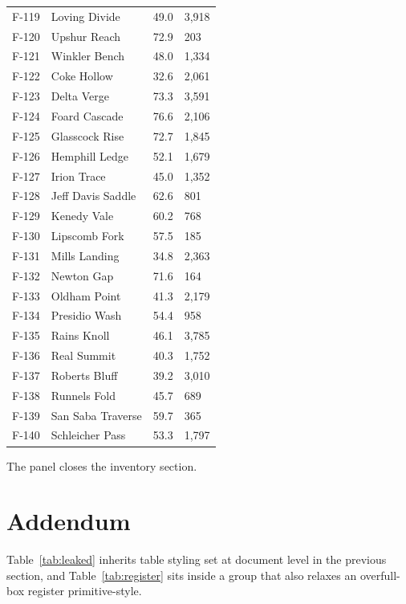 \documentclass[11pt]{article}
\begin{document}
\begin{longtable}{C{1.4cm} L{4.6cm} C{2.0cm} C{2.4cm}}
F-119 & Loving Divide & 49.0 & 3{,}918 \\
F-120 & Upshur Reach & 72.9 & 203 \\
F-121 & Winkler Bench & 48.0 & 1{,}334 \\
F-122 & Coke Hollow & 32.6 & 2{,}061 \\
F-123 & Delta Verge & 73.3 & 3{,}591 \\
F-124 & Foard Cascade & 76.6 & 2{,}106 \\
F-125 & Glasscock Rise & 72.7 & 1{,}845 \\
F-126 & Hemphill Ledge & 52.1 & 1{,}679 \\
F-127 & Irion Trace & 45.0 & 1{,}352 \\
F-128 & Jeff Davis Saddle & 62.6 & 801 \\
F-129 & Kenedy Vale & 60.2 & 768 \\
F-130 & Lipscomb Fork & 57.5 & 185 \\
F-131 & Mills Landing & 34.8 & 2{,}363 \\
F-132 & Newton Gap & 71.6 & 164 \\
F-133 & Oldham Point & 41.3 & 2{,}179 \\
F-134 & Presidio Wash & 54.4 & 958 \\
F-135 & Rains Knoll & 46.1 & 3{,}785 \\
F-136 & Real Summit & 40.3 & 1{,}752 \\
F-137 & Roberts Bluff & 39.2 & 3{,}010 \\
F-138 & Runnels Fold & 45.7 & 689 \\
F-139 & San Saba Traverse & 59.7 & 365 \\
F-140 & Schleicher Pass & 53.3 & 1{,}797 \\
\end{longtable}
\endgroup

The panel closes the inventory section.

\setlength{\tabcolsep}{2.5pt}
\renewcommand{\arraystretch}{1.18}

\section{Addendum}

Table~\ref{tab:leaked} inherits table styling set at document level in the
previous section, and Table~\ref{tab:register} sits inside a group that also
relaxes an overfull-box register primitive-style.
\end{document}
